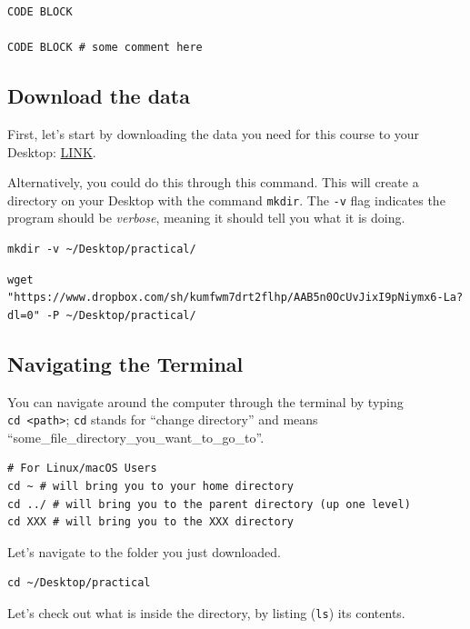 \documentclass[
]{book}
\begin{document}
\begin{verbatim}
CODE BLOCK

CODE BLOCK # some comment here
\end{verbatim}

\hypertarget{download-the-data}{%
\subsection{Download the data}\label{download-the-data}}

First, let's start by downloading the data you need for this course to your Desktop: \href{}{LINK}.

Alternatively, you could do this through this command. This will create a directory on your Desktop with the command \texttt{mkdir}. The \texttt{-v} flag indicates the program should be \emph{verbose}, meaning it should tell you what it is doing.

\begin{verbatim}
mkdir -v ~/Desktop/practical/
\end{verbatim}

\begin{verbatim}
wget "https://www.dropbox.com/sh/kumfwm7drt2flhp/AAB5n0OcUvJixI9pNiymx6-La?dl=0" -P ~/Desktop/practical/
\end{verbatim}

\hypertarget{navigating-the-terminal}{%
\subsection{Navigating the Terminal}\label{navigating-the-terminal}}

You can navigate around the computer through the terminal by typing \texttt{cd\ \textless{}path\textgreater{}}; \texttt{cd} stands for ``change directory'' and means ``some\_file\_directory\_you\_want\_to\_go\_to''.

\begin{verbatim}
# For Linux/macOS Users
cd ~ # will bring you to your home directory
cd ../ # will bring you to the parent directory (up one level) 
cd XXX # will bring you to the XXX directory
\end{verbatim}

Let's navigate to the folder you just downloaded.

\begin{verbatim}
cd ~/Desktop/practical
\end{verbatim}

Let's check out what is inside the directory, by listing (\texttt{ls}) its contents.
\end{document}

